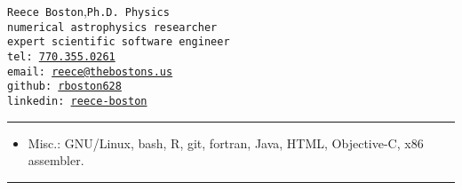 \documentclass[11pt, letter]{article}
\begin{document}
\begin{multicols}{2}
 \noindent %
 {\tt \huge  Reece Boston},\hfill{\tt \large Ph.D.~Physics}\\
	{\tt\small numerical astrophysics researcher\hfill\drawplanet}\\
	{\tt\small expert scientific software engineer\hfill\drawcalculator\hspace{1pt}\mbox{}}
%
 \columnbreak\\
 \mbox{}\hfill{\tt \small tel: \href{tel:770-355-0261}{770.355.0261}\hphantom{aaaaaaa}}\\  %
 \mbox{}\hfill{\tt \small email: \href{mailto:Reece@thebostons.us}{reece@thebostons.us}}\\ %
 \mbox{}\hfill{\tt \small github: \href{https://github.com/rboston628}{rboston628}\hphantom{aaaaaaaaa}}\\%
 \mbox{}\hfill{\tt \small linkedin: \href{https://www.linkedin.com/in/reece-boston-752046117/}{reece-boston}\hphantom{aaaaaaa}}%
\end{multicols}

\hrule
\begin{itemize}
		\item Misc.: GNU/Linux, bash, R,  git, fortran, Java, HTML, Objective-C, x86 assembler.
	\end{itemize}
\hrule
\vspace{-0.5\baselineskip}

\end{document}
